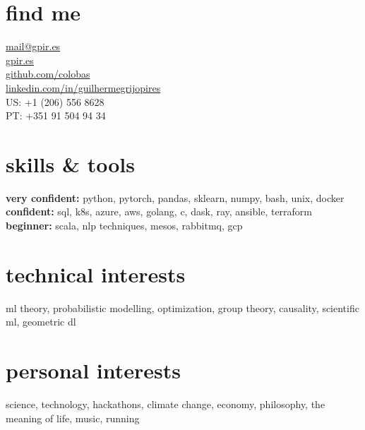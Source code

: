 \documentclass[]{colobas-cv}
\begin{document}

\begin{minipage}[t]{0.3\textwidth}
\section{find me}
  \vspace{7pt}
  \href{mailto:mail@gpir.es}{mail@gpir.es}\\
  \href{https://gpir.es}{gpir.es}\\
  \href{https://github.com/colobas}{github.com/colobas}\\
  \href{https://linkedin.com/in/guilhermegrijopires/}{linkedin.com/in/guilhermegrijopires}\\
  US: +1 (206) 556 8628\\
  PT: +351 91 504 94 34%
\end{minipage}
\hfill
\begin{minipage}[t]{0.3\textwidth}
\section{skills \& tools}
  \vspace{7pt}
  \textbf{very confident:} python, pytorch, pandas, sklearn, numpy, bash, unix, docker\\
  \textbf{confident:} sql, k8s, azure, aws, golang, c, dask, ray, ansible, terraform\\
  \textbf{beginner:} scala, nlp techniques, mesos, rabbitmq, gcp%
\end{minipage}
\hfill
\begin{minipage}[t]{0.3\textwidth}
\section{technical interests}
  \vspace{7pt}
  ml theory, probabilistic modelling, optimization, group theory, causality,
  scientific ml, geometric dl%
  \vspace{15pt}
\section{personal interests}
  \vspace{7pt}
  science, technology, hackathons, climate change, economy, philosophy, the meaning of life,
  music, running
\end{minipage}

\vspace{0.5cm}
\end{document}
